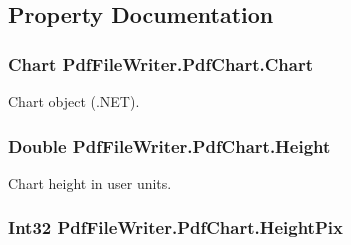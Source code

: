 \subsection{Property Documentation}
\subsubsection[{\texorpdfstring{Chart}{Chart}}]{\setlength{\rightskip}{0pt plus 5cm}Chart Pdf\+File\+Writer.\+Pdf\+Chart.\+Chart\hspace{0.3cm}{\ttfamily [get]}}\hypertarget{class_pdf_file_writer_1_1_pdf_chart_aa08931d631c7d005f289c4960423a305}{}\label{class_pdf_file_writer_1_1_pdf_chart_aa08931d631c7d005f289c4960423a305}


Chart object (.N\+ET). 

\subsubsection[{\texorpdfstring{Height}{Height}}]{\setlength{\rightskip}{0pt plus 5cm}Double Pdf\+File\+Writer.\+Pdf\+Chart.\+Height\hspace{0.3cm}{\ttfamily [get]}}\hypertarget{class_pdf_file_writer_1_1_pdf_chart_a4216487a4cf01f891007685a128bd328}{}\label{class_pdf_file_writer_1_1_pdf_chart_a4216487a4cf01f891007685a128bd328}


Chart height in user units. 

\subsubsection[{\texorpdfstring{Height\+Pix}{HeightPix}}]{\setlength{\rightskip}{0pt plus 5cm}Int32 Pdf\+File\+Writer.\+Pdf\+Chart.\+Height\+Pix\hspace{0.3cm}{\ttfamily [get]}}\hypertarget{class_pdf_file_writer_1_1_pdf_chart_a69b29f5c270465945d945b120b56b4e9}{}\label{class_pdf_file_writer_1_1_pdf_chart_a69b29f5c270465945d945b120b56b4e9}


